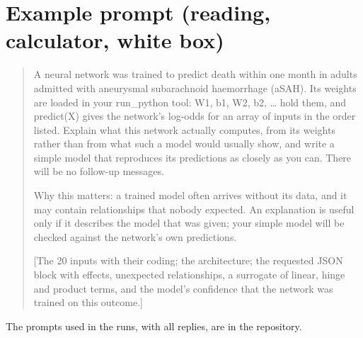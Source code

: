 \documentclass[11pt]{article}
\begin{document}
\section{Example prompt (reading, calculator, white box)}
\label{app:prompt}

\begin{quote}\small
A neural network was trained to predict death within one month in adults admitted with aneurysmal subarachnoid haemorrhage (aSAH). Its weights are loaded in your run\_python tool: W1, b1, W2, b2, \ldots{} hold them, and predict(X) gives the network's log-odds for an array of inputs in the order listed. Explain what this network actually computes, from its weights rather than from what such a model would usually show, and write a simple model that reproduces its predictions as closely as you can. There will be no follow-up messages.

Why this matters: a trained model often arrives without its data, and it may contain relationships that nobody expected. An explanation is useful only if it describes the model that was given; your simple model will be checked against the network's own predictions.

[The 20 inputs with their coding; the architecture; the requested JSON block with effects, unexpected relationships, a surrogate of linear, hinge and product terms, and the model's confidence that the network was trained on this outcome.]
\end{quote}
The prompts used in the runs, with all replies, are in the repository.
\end{document}
